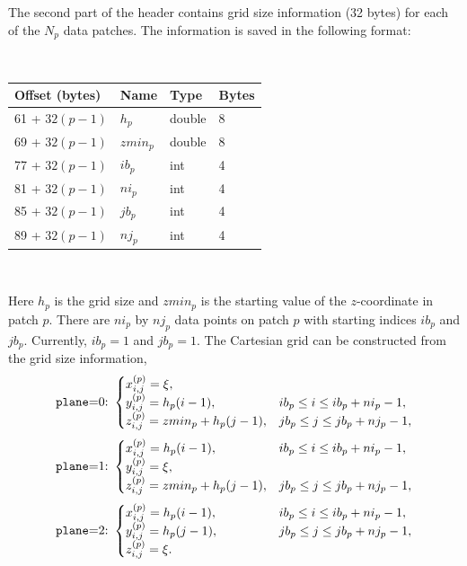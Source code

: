\documentclass[11pt]{report}
\begin{document}
{The second part of the header contains grid size information (32 bytes)
for each of the $N_p$ data patches. The information is saved in the following format:
{\samepage
\begin{center}
	\hspace{-35mm}{\tt for ($p=1$; $p\leq N_p$; $p$++)}\nopagebreak \\
	\vspace{2mm}
	\begin{tabular}{llll}\hline
		Offset (bytes)   & Name       & Type   & Bytes \\ \hline
		61 + $32(p - 1)$ & $h_{p}$    & double & 8     \\ \hline
		69 + $32(p - 1)$ & $zmin_{p}$ & double & 8     \\ \hline
		77 + $32(p - 1)$ & $ib_{p}$   & int    & 4     \\ \hline
		81 + $32(p - 1)$ & $ni_{p}$   & int    & 4     \\ \hline
		85 + $32(p - 1)$ & $jb_{p}$   & int    & 4     \\ \hline
		89 + $32(p - 1)$ & $nj_{p}$   & int    & 4     \\ \hline
	\end{tabular}\\
\end{center}
}
Here $h_p$ is the grid size and $zmin_p$ is the starting value of the $z$-coordinate in patch
$p$. There are $ni_p$ by $nj_p$ data points on patch $p$ with starting indices $ib_p$ and
$jb_p$. Currently, $ib_p=1$ and $jb_p=1$. The Cartesian grid can be constructed from the
grid size information,
\[
	\mbox{{\tt plane}=0:}\ \begin{cases}
		x^{(p)}_{i,j} = \xi,                                             \\
		y^{(p)}_{i,j} = h_p(i-1),          & ib_p\leq i\leq ib_p+ni_p-1, \\
		z^{(p)}_{i,j} = zmin_p + h_p(j-1), & jb_p\leq j\leq jb_p+nj_p-1,
	\end{cases}
\]
\[
	\mbox{{\tt plane}=1:}\ \begin{cases}
		x^{(p)}_{i,j} = h_p(i-1),          & ib_p\leq i\leq ib_p+ni_p-1, \\
		y^{(p)}_{i,j} = \xi,                                             \\
		z^{(p)}_{i,j} = zmin_p + h_p(j-1), & jb_p\leq j\leq jb_p+nj_p-1,
	\end{cases}
\]
\[
	\mbox{{\tt plane}=2:}\ \begin{cases}
		x^{(p)}_{i,j} = h_p(i-1), & \qquad \qquad ib_p\leq i\leq ib_p+ni_p-1, \\
		y^{(p)}_{i,j} = h_p(j-1), & \qquad \qquad jb_p\leq j\leq jb_p+nj_p-1, \\
		z^{(p)}_{i,j} = \xi.
	\end{cases}
\]

}
\end{document}
